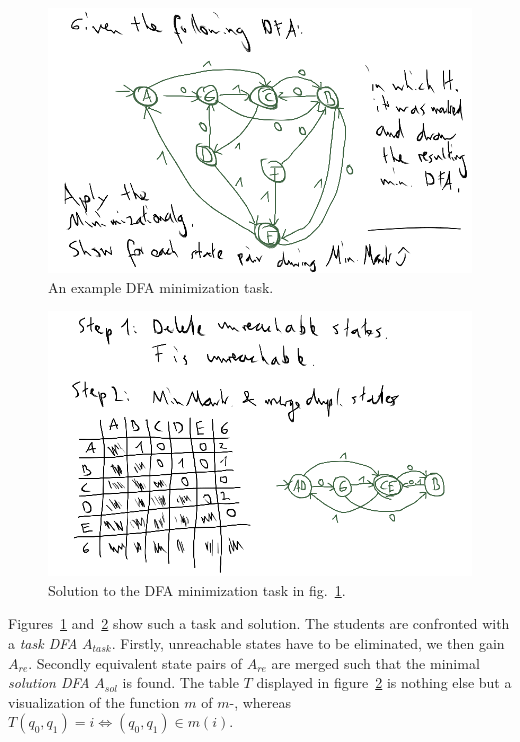 \begin{figure}
\includegraphics[width=\linewidth]{images/dfa_ex_task.png}
\caption{An example DFA minimization task.}
\label{fig:dfa_ex_task}
\end{figure}

\begin{figure}
\includegraphics[width=\linewidth]{images/dfa_ex_sol.png}
\caption{Solution to the DFA minimization task in fig.~\ref{fig:dfa_ex_task}.}
\label{fig:dfa_ex_sol}
\end{figure}

\noindent Figures~\ref{fig:dfa_ex_task} and~\ref{fig:dfa_ex_sol} show such a task and solution. The students are confronted with a \emph{task DFA} $A_{task}$. Firstly, unreachable states have to be eliminated, we then gain $A_{re}$. Secondly equivalent state pairs of $A_{re}$ are merged such that the minimal \emph{solution DFA} $A_{sol}$ is found. The table $T$ displayed in figure~\ref{fig:dfa_ex_sol} is nothing else but a visualization of the function $m$ of $m$-\CompDist, whereas $T(q_0, q_1) = i \Leftrightarrow (q_0, q_1) \in m(i)$.

